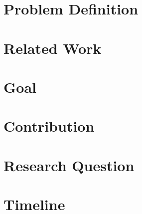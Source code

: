 \begin{frame}
 \titlepage
\end{frame}

\section{Problem Definition}


\section{Related Work}


\section{Goal}


\section{Contribution}


\section{Research Question}



\section{Timeline}

